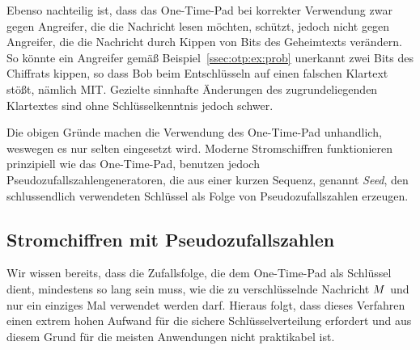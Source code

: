 Ebenso nachteilig ist, dass das One-Time-Pad bei korrekter Verwendung zwar gegen Angreifer, die die Nachricht lesen möchten, schützt, jedoch nicht gegen Angreifer, die die Nachricht durch Kippen von Bits des Geheimtexts verändern. So könnte ein Angreifer gemäß Beispiel~\ref{ssec:otp:ex:prob} unerkannt zwei Bits des Chiffrats kippen, so dass Bob beim Entschlüsseln auf einen falschen Klartext stößt, nämlich MIT. Gezielte sinnhafte Änderungen des zugrundeliegenden Klartextes sind ohne Schlüsselkenntnis jedoch schwer. 

Die obigen Gründe machen die Verwendung des One-Time-Pad unhandlich, weswegen es nur selten eingesetzt wird. Moderne Stromschiffren funktionieren prinzipiell wie das One-Time-Pad, benutzen jedoch Pseudozufallszahlengeneratoren\indexPRNG, die aus einer kurzen Sequenz, genannt \emph{Seed}\indexSeed, den schlussendlich verwendeten Schlüssel als Folge von Pseudozufallszahlen erzeugen.

\subsection{Stromchiffren mit Pseudozufallszahlen}
\label{ssec:stromchiffrenpseudozufall}
Wir wissen bereits, dass die Zufallsfolge, die dem One-Time-Pad als Schlüssel dient, mindestens so lang sein muss, wie die zu verschlüsselnde Nachricht $M$ und nur ein einziges Mal verwendet werden darf. Hieraus folgt, dass dieses Verfahren einen extrem hohen Aufwand für die sichere Schlüsselverteilung erfordert und aus diesem Grund für die meisten Anwendungen nicht praktikabel ist.


